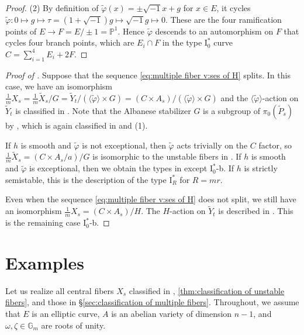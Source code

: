\documentclass[reqno, letterpaper]{amsart}
\numberwithin{equation}{subsection}
\let\to\longrightarrow
\let\mapsto\longmapsto
\newcommand{\GG}{\mathbb{G}}
\newcommand{\PP}{\mathbb{P}}
\begin{document}
\begin{proof}
			\medskip
			
			(2) By definition of $\tilde \varphi(x) = \pm \sqrt{-1} x + g$ for $x \in E$, it cycles $\tilde \varphi : 0 \mapsto g \mapsto \tau = (1+\sqrt{-1})g \mapsto \sqrt{-1}g \mapsto 0$. These are the four ramification points of $E \to F = E / \pm1 = \PP^1$. Hence $\tilde \varphi$ descends to an automorphism on $F$ that cycles four branch points, which are $E_i \cap F$ in the type $\mathrm I_0^*$ curve $C = \sum_{i=1}^4 E_i + 2F$.
		\end{proof}
		
		\begin{proof} [Proof of ]
			Suppose that the sequence \eqref{eq:multiple fiber v:ses of H} splits. In this case, we have an isomorphism $\tfrac{1}{m} X_s = \tfrac{1}{m} \tilde X_s / G = \tilde Y_t / (\langle \tilde \varphi \rangle \times G) = (C \times A_s) / (\langle \tilde \varphi \rangle \times G)$ and the $\langle \tilde \varphi \rangle$-action on $\tilde Y_t$ is classified in . Note that the Albanese stabilizer $G$ is a subgroup of $\pi_0(\tilde P_s)$ by , which is again classified in  and (1).
			
			If $h$ is smooth and $\tilde \varphi$ is not exceptional, then $\tilde \varphi$ acts trivially on the $C$ factor, so $\frac{1}{m} \tilde X_s = (C \times A_s/a) / G$ is isomorphic to the unstable fibers in . If $h$ is smooth and $\tilde \varphi$ is exceptional, then we obtain the types in  except $\mathrm I_0^*$-b. If $h$ is strictly semistable, this is the description of the type $\mathrm I_R^*$ for $R = mr$.
			
			\medskip
			
			Even when the sequence \eqref{eq:multiple fiber v:ses of H} does not split, we still have an isomorphism $\tfrac{1}{m} X_s = (C \times A_s) / H$. The $H$-action on $\tilde Y_t$ is described in . This is the remaining case $\mathrm I_0^*$-b.
		\end{proof}
		
		
		
\section{Examples} \label{sec:examples}
	Let us realize all central fibers $X_s$ classified in , \ref{thm:classification of unstable fibers}, and those in \S \ref{sec:classification of multiple fibers}. Throughout, we assume that $E$ is an elliptic curve, $A$ is an abelian variety of dimension $n-1$, and $\omega, \zeta \in \GG_m$ are roots of unity.
	
\end{document}
